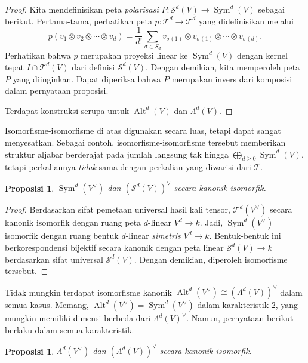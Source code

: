 \documentclass[12pt]{article}
\theoremstyle{plain}
\newtheorem{proposition}[theorem]{Proposisi}
\theoremstyle{definition}
\theoremstyle{remark}
\numberwithin{equation}{section}
\begin{document}
\begin{proof}
Kita mendefinisikan peta \emph{polarisasi}
$P : \mathcal{S}^d(V) \to \operatorname{Sym}^d(V)$ sebagai berikut.
Pertama-tama, perhatikan peta $p : \mathcal{T}^d \to \mathcal{T}^d$
yang didefinisikan melalui
\[
p(v_1 \otimes v_2 \otimes \cdots \otimes v_d)
= \frac{1}{d!}\sum_{\sigma \in S_d}
v_{\sigma(1)} \otimes v_{\sigma(1)} \otimes \cdots \otimes v_{\sigma(d)}
.
\]
Perhatikan bahwa $p$ merupakan proyeksi linear ke $\operatorname{Sym}^d(V)$
dengan kernel tepat $I \cap \mathcal{T}^d(V)$ dari definisi
$\mathcal{S}^d(V)$. Dengan demikian, kita memperoleh peta $P$ yang diinginkan.
Dapat diperiksa bahwa $P$ merupakan invers dari komposisi dalam pernyataan
proposisi.

Terdapat konstruksi serupa untuk $\operatorname{Alt}^d(V)$
dan $\Lambda^d(V)$.
\end{proof}

Isomorfisme-isomorfisme di atas digunakan secara luas, tetapi dapat
sangat menyesatkan. Sebagai contoh, isomorfisme-isomorfisme tersebut memberikan
struktur aljabar berderajat pada jumlah langsung tak hingga
$\bigoplus_{d\ge 0}\operatorname{Sym}^d(V)$,
tetapi perkaliannya \emph{tidak} sama dengan perkalian yang diwarisi dari
$\mathcal{T}$.

\begin{proposition}
$\operatorname{Sym}^d(V^\vee)$ dan $\left(\mathcal{S}^d(V)\right)^\vee$
secara kanonik isomorfik.
\end{proposition}

\begin{proof}
Berdasarkan sifat pemetaan universal hasil kali tensor,
$\mathcal{T}^d(V^\vee)$ secara kanonik isomorfik dengan ruang
peta $d$-linear $V^d \to k$.
Jadi, $\operatorname{Sym}^d(V^\vee)$ isomorfik dengan
ruang bentuk $d$-linear \emph{simetris} $V^d \to k$.
Bentuk-bentuk ini berkorespondensi bijektif secara kanonik dengan peta linear
$\mathcal{S}^d(V) \to k$ berdasarkan sifat universal
$\mathcal{S}^d(V)$. Dengan demikian, diperoleh isomorfisme tersebut.
\end{proof}

Tidak mungkin terdapat isomorfisme kanonik
$\operatorname{Alt}^d(V^\vee) \cong \left(\Lambda^d(V)\right)^\vee$
dalam semua kasus. Memang,
$\operatorname{Alt}^d(V^\vee) = \operatorname{Sym}^d(V^\vee)$
dalam karakteristik $2$, yang mungkin memiliki dimensi berbeda dari
$\Lambda^d(V)^\vee$.
Namun, pernyataan berikut berlaku dalam semua karakteristik.

\begin{proposition}
$\Lambda^d(V^\vee)$ dan $\left(\Lambda^d(V)\right)^\vee$
secara kanonik isomorfik.
\end{proposition}
\end{document}
